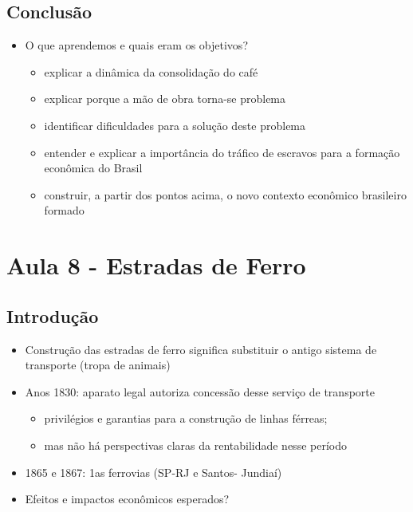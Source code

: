 \documentclass[a4paper,12pt]{article}[abntex2]
\begin{document}
\subsection{\textbf{Conclusão}}
\begin{itemize}
    \item O que aprendemos e quais eram os objetivos?
    \begin{itemize}
        \item  explicar a dinâmica da consolidação do café
    \end{itemize}  
    \begin{itemize}
        \item explicar porque a mão de obra torna-se problema
    \end{itemize}
    \begin{itemize}
        \item identificar dificuldades para a solução deste problema
    \end{itemize}
    \begin{itemize}
        \item entender e explicar a importância do tráfico de escravos para a formação econômica do Brasil
    \end{itemize} 
    \begin{itemize}
        \item construir, a partir dos pontos acima, o novo contexto econômico brasileiro formado
    \end{itemize}
\end{itemize}
\newpage

\section{\textbf{Aula 8 - Estradas de Ferro}}
\subsection{\textbf{Introdução}}
\begin{itemize}
    \item Construção das estradas de ferro significa substituir o antigo sistema de transporte (tropa de animais)
    \item Anos 1830: aparato legal autoriza concessão desse serviço de transporte
    \begin{itemize}
        \item   privilégios e garantias para a construção de linhas férreas;
    \end{itemize}
    \begin{itemize}
        \item mas não há perspectivas claras da rentabilidade nesse período
    \end{itemize}
    \item 1865 e 1867: 1as ferrovias (SP-RJ e Santos- Jundiaí)
    \item Efeitos e impactos econômicos esperados?
\end{itemize}
\end{document}
